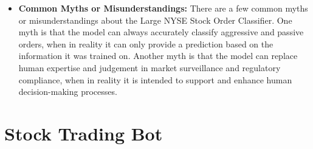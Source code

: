 \begin{itemize}
    \item \textbf{Common Myths or Misunderstandings:} There are a few common myths or misunderstandings about the Large NYSE Stock Order Classifier. One myth is that the model can always accurately classify aggressive and passive orders, when in reality it can only provide a prediction based on the information it was trained on. Another myth is that the model can replace human expertise and judgement in market surveillance and regulatory compliance, when in reality it is intended to support and enhance human decision-making processes.
\end{itemize}

\section{Stock Trading Bot}

